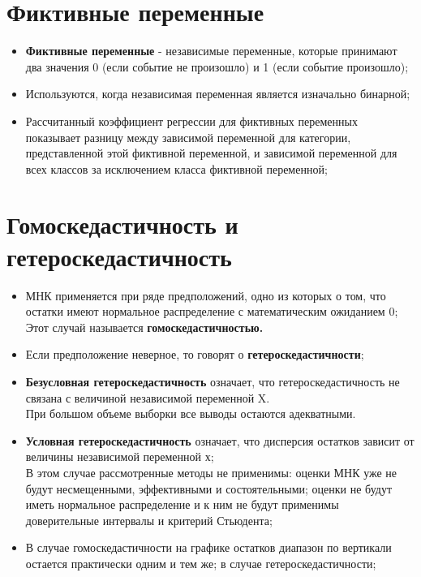 \documentclass{article}
\begin{document}
\section{Фиктивные переменные}\label{sec:dummy}
\begin{itemize}
    \item \textbf{Фиктивные переменные} - независимые переменные, которые принимают два значения 0 (если событие не произошло) и 1 (если событие произошло);
    \item Используются, когда независимая переменная является изначально бинарной;
    \item Рассчитанный коэффициент регрессии для фиктивных переменных показывает разницу между зависимой переменной для категории, представленной этой фиктивной переменной, и зависимой переменной для всех классов за исключением класса фиктивной переменной;
\end{itemize}

\section{Гомоскедастичность и гетероскедастичность}\label{sec:gomo-and-getero}
\begin{itemize}
    \item МНК применяется при ряде предположений, одно из которых о том, что остатки имеют нормальное распределение с математическим ожиданием 0; \\
    Этот случай называется \textbf{гомоскедастичностью.}
    \item Если предположение неверное, то говорят о \textbf{гетероскедастичности};
    \item \textbf{Безусловная гетероскедастичность} означает, что гетероскедастичность не связана с величиной независимой переменной X. 
    \\
    При большом объеме выборки все выводы остаются адекватными.
    \item \textbf{Условная гетероскедастичность} означает, что дисперсия остатков зависит от величины независимой переменной х; \\
    В этом случае рассмотренные методы не применимы: оценки МНК уже не будут несмещенными, эффективными и состоятельными; оценки не будут иметь нормальное распределение и к ним не будут применимы доверительные интервалы и критерий Стьюдента;
    \item В случае гомоскедастичности на графике остатков диапазон по вертикали остается практически одним и тем же; в случае гетероскедастичности;
\end{itemize}
\end{document}
